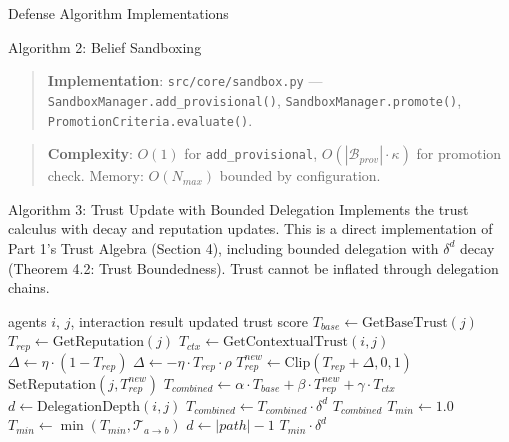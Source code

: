 \documentclass[
  ignorenonframetext,
]{beamer}
\begin{document}
\begin{frame}[fragile]{Defense Algorithm Implementations}
\begin{block}{Algorithm 2: Belief Sandboxing}
\begin{quote}
\textbf{Implementation}: \texttt{src/core/sandbox.py} ---
\texttt{SandboxManager.add\_provisional()},
\texttt{SandboxManager.promote()},
\texttt{PromotionCriteria.evaluate()}.
\end{quote}

\begin{quote}
\textbf{Complexity}: \(O(1)\) for \texttt{add\_provisional},
\(O(|\mathcal{B}_{prov}| \cdot \kappa)\) for promotion check. Memory:
\(O(N_{max})\) bounded by configuration.
\end{quote}
\end{block}

\begin{block}{Algorithm 3: Trust Update with Bounded Delegation}
\protect{}\label{sec:alg-trust}
Implements the trust calculus with decay and reputation updates. This is
a direct implementation of Part 1's Trust Algebra (Section 4), including
bounded delegation with \(\delta^d\) decay (Theorem 4.2: Trust
Boundedness). Trust cannot be inflated through delegation chains.

\begin{algorithm}
\caption{Trust Update Operations}
\label{alg:trust-impl}
\begin{algorithmic}[1]
\Require agents $i$, $j$, interaction result
\Ensure updated trust score
  \State $T_{base} \gets \text{GetBaseTrust}(j)$
  \State $T_{rep} \gets \text{GetReputation}(j)$
  \State $T_{ctx} \gets \text{GetContextualTrust}(i, j)$
    \State $\Delta \gets \eta \cdot (1 - T_{rep})$
  \Else
    \State $\Delta \gets -\eta \cdot T_{rep} \cdot \rho$
  \EndIf
  \State $T_{rep}^{new} \gets \text{Clip}(T_{rep} + \Delta, 0, 1)$
  \State $\text{SetReputation}(j, T_{rep}^{new})$
  \State $T_{combined} \gets \alpha \cdot T_{base} + \beta \cdot T_{rep}^{new} + \gamma \cdot T_{ctx}$
    \State $d \gets \text{DelegationDepth}(i, j)$
    \State $T_{combined} \gets T_{combined} \cdot \delta^d$
  \EndIf
  \Return $T_{combined}$
\EndFunction
{}
  \State $T_{min} \gets 1.0$
    \State $T_{min} \gets \min(T_{min}, \mathcal{T}_{a \to b})$
  \EndFor
  \State $d \gets |path| - 1$
  \Return $T_{min} \cdot \delta^d$
\EndFunction
\end{algorithmic}
\end{algorithm}


\end{block}
\end{frame}
\end{document}
